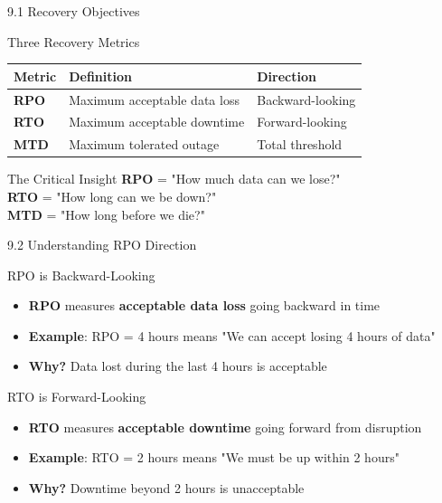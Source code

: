 \documentclass{beamer}
\begin{document}
	\begin{frame}{9.1 Recovery Objectives}
		\begin{block}{Three Recovery Metrics}
			\begin{tabular}{|p{2.5cm}|p{4cm}|p{4.5cm}|}
				\hline
				\textbf{Metric} & \textbf{Definition} & \textbf{Direction} \\
				\hline
				\textbf{RPO} & Maximum acceptable data loss & Backward-looking \\
				\hline
				\textbf{RTO} & Maximum acceptable downtime & Forward-looking \\
				\hline
				\textbf{MTD} & Maximum tolerated outage & Total threshold \\
				\hline
			\end{tabular}
		\end{block}
		
		\begin{alertblock}{The Critical Insight}
			\textbf{RPO} = "How much data can we lose?" \\
			\textbf{RTO} = "How long can we be down?" \\
			\textbf{MTD} = "How long before we die?"
		\end{alertblock}
	\end{frame}
	
	\begin{frame}{9.2 Understanding RPO Direction}
		\begin{block}{RPO is Backward-Looking}
			\begin{itemize}
				\item \textbf{RPO} measures \textbf{acceptable data loss} going backward in time
				\item \textbf{Example}: RPO = 4 hours means "We can accept losing 4 hours of data"
				\item \textbf{Why?} Data lost during the last 4 hours is acceptable
			\end{itemize}
		\end{block}
		
		\begin{block}{RTO is Forward-Looking}
			\begin{itemize}
				\item \textbf{RTO} measures \textbf{acceptable downtime} going forward from disruption
				\item \textbf{Example}: RTO = 2 hours means "We must be up within 2 hours"
				\item \textbf{Why?} Downtime beyond 2 hours is unacceptable
			\end{itemize}
		\end{block}
	\end{frame}
	
\end{document}
